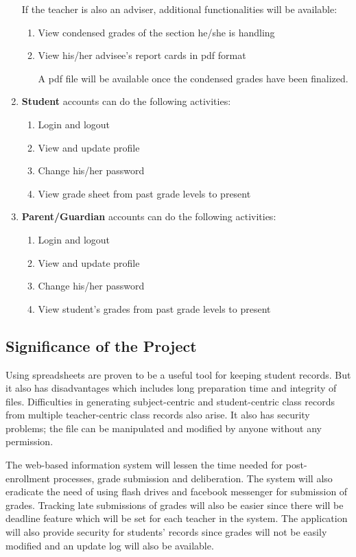 \documentclass[11pt,a4paper,titlepage]{article}
\begin{document}
\begin{enumerate}
    If the teacher is also an adviser, additional functionalities will be available:

    \begin{enumerate}
        \item View condensed grades of the section he/she is handling
        \item View his/her advisee's report cards in pdf format
        
        A pdf file will be available once the condensed grades have been finalized.
    \end{enumerate}
    \item \textbf{Student} accounts can do the following activities:
    \begin{enumerate}
        \item Login and logout
        \item View and update profile
        \item Change his/her password
        \item View grade sheet from past grade levels to present
    \end{enumerate}
    \item \textbf{Parent/Guardian} accounts can do the following activities:
    \begin{enumerate}
        \item Login and logout
        \item View and update profile
        \item Change his/her password
        \item View student's grades from past grade levels to present
    \end{enumerate}


\end{enumerate}

\subsection{Significance of the Project}
Using spreadsheets are proven to be a useful tool for keeping student records. But it also has disadvantages which includes long preparation time and integrity of files. Difficulties in generating subject-centric and student-centric class records from multiple teacher-centric class records also arise. It also has security problems; the file can be manipulated and modified by anyone without any permission.

The web-based information system will lessen the time needed for post-enrollment processes, grade submission and deliberation. The system will also eradicate the need of using flash drives and facebook messenger for submission of grades. Tracking late submissions of grades will also be easier since there will be deadline feature which will be set for each teacher in the system. The application will also provide security for students' records since grades will not be easily modified and an update log will also be available.
\end{document}
